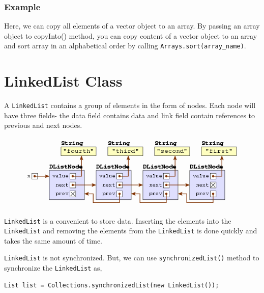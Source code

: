 \documentclass[11pt,a4paper]{article}
\begin{document}
\subsubsection*{Example}
Here, we can copy all elements of a vector object to an array. By passing an array object to copyInto() method, you can copy content of a vector object to an array and sort array in an alphabetical order by calling \texttt{Arrays.sort(array\_name)}.


\section*{LinkedList Class}
A \texttt{LinkedList} contains a group of elements in the form of nodes. Each node will have three fields- the data field contains data and link field contain references to previous and next nodes.

\begin{figure}[H]
\begin{center}
\includegraphics[scale=0.6]{linkedlist-flow.png}
\end{center}
\end{figure}

\texttt{LinkedList} is a convenient to store data. Inserting the elements into the \texttt{LinkedList} and removing the elements from the \texttt{LinkedList} is done quickly and takes the same amount of time.


\texttt{LinkedList} is not synchronized. But, we can use \texttt{synchronizedList()} method to synchronize the \texttt{LinkedList} as,
\begin{lstlisting}[numbers=none]
List list = Collections.synchronizedList(new LinkedList());
\end{lstlisting}
\end{document}
